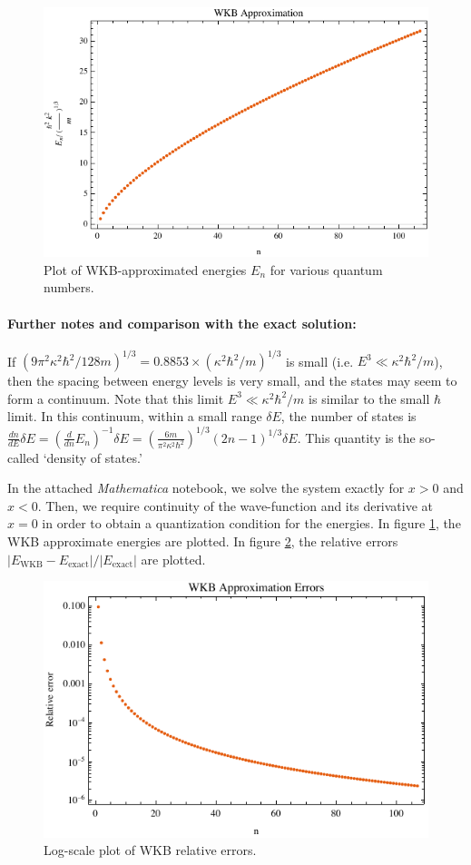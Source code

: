 \documentclass[10pt]{article}
\newcommand{\1}{\mathbf 1}
\begin{document}
\begin{figure}[h!]
	\centering
	\includegraphics[width=0.7\linewidth]{WKBenergies.pdf}
	\caption{\label{WKBenergies}
		Plot of WKB-approximated energies $E_n$ for various quantum numbers.
	}
\end{figure}

\paragraph{Further notes and comparison with the exact solution:}

If $\left(9 \pi^2 \kappa^2 \hbar^2 / 128m\right)^{1/3} = 0.8853 \times (\kappa^2 \hbar^2 / m)^{1/3}$ is small (i.e. $E^3 \ll \kappa^2 \hbar^2 / m$), then the spacing between energy levels is very small, and the states may seem to form a continuum.
Note that this limit $E^3 \ll \kappa^2 \hbar^2 / m$ is similar to the small $\hbar$ limit.
In this continuum, within a small range $\delta E$, the number of states is $\frac{dn}{dE}\delta E = 
(\frac{d}{dn} E_n)^{-1} \delta E = 
\left(
	\frac{6m}{\pi^2\kappa^2 \hbar^2}
\right)^{1/3} (2n-1)^{1/3}
\delta E
$.
This quantity is the so-called `density of states.'

In the attached {\em Mathematica} notebook, we solve the system exactly for $x>0$ and $x<0$.
Then, we require continuity of the wave-function and its derivative at $x = 0$ in order to obtain a quantization condition for the energies.
In figure \ref{WKBenergies}, the WKB approximate energies are plotted.
In figure \ref{WKBerrors}, the relative errors $|E_\text{WKB} - E_\text{exact}|/|E_\text{exact}|$ are plotted.

\begin{figure}
	\centering
	\includegraphics[width=0.7\linewidth]{WKBerrors.pdf}
	\caption{
		\label{WKBerrors}
		Log-scale plot of WKB relative errors.
	}
\end{figure}
\end{document}
